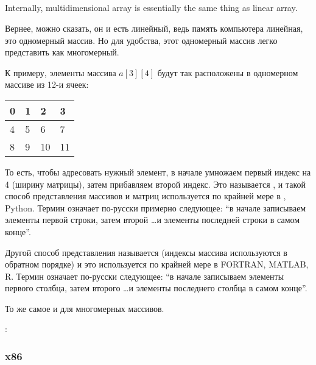 ﻿\subsection{}

{Internally, multidimensional array is essentially the same thing as linear array.}

Вернее, можно сказать, он и есть линейный, ведь память компьютера линейная, это одномерный массив.
Но для удобства, этот одномерный массив легко представить как многомерный.

К примеру, элементы массива $a[3][4]$ будут так расположены в одномерном массиве из 12-и ячеек:

\begin{center}
\begin{tabular}{ | l | l | l | l | }
\hline                        
0 & 1 & 2 & 3 \\
\hline  
4 & 5 & 6 & 7 \\
\hline  
8 & 9 & 10 & 11 \\
\hline  
\end{tabular}
\end{center}

То есть, чтобы адресовать нужный элемент, в начале умножаем первый индекс на 4 (ширину матрицы), 
затем прибавляем второй индекс. Это называется , и такой способ представления массивов
и матриц используется по крайней мере в \CCpp, Python. Термин  означает по-русски
примерно следующее: ``в начале записываем элементы первой строки, затем второй \dots и элементы последней 
строки в самом конце''.

Другой способ представления называется  (индексы массива используются в 
обратном порядке) и это
используется по крайней мере в FORTRAN, MATLAB, R. Термин  означает по-русски
следующее: ``в начале записываем элементы первого столбца, затем второго \dots и элементы последнего столбца
в самом конце''.

То же самое и для многомерных массивов.

:



\subsubsection{x86}

